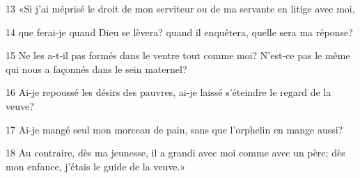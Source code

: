 
13 «Si j’ai méprisé le droit de mon serviteur ou de ma servante en litige avec moi,

14 que ferai-je quand Dieu se lèvera? quand il enquêtera, quelle sera ma réponse?

15 Ne les a-t-il pas formés dans le ventre tout comme moi? N’est-ce pas le même qui nous a façonnés dans le sein maternel?

16 Ai-je repoussé les désirs des pauvres, ai-je laissé s’éteindre le regard de la veuve?

17 Ai-je mangé seul mon morceau de pain, sans que l’orphelin en mange aussi?

18 Au contraire, dès ma jeunesse, il a grandi avec moi comme avec un père; dès mon enfance, j’étais le guide de la veuve.»